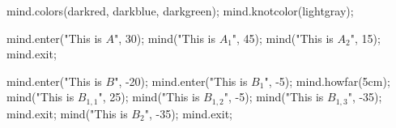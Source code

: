\usemodule[mindmap]
\startMPpage
mind.colors(darkred, darkblue, darkgreen);
mind.knotcolor(lightgray);

mind.enter("This is $A$", 30);
    mind("This is $A_1$", 45);
    mind("This is $A_2$", 15);
mind.exit;

mind.enter("This is $B$", -20);
    mind.enter("This is $B_{1}$", -5);
        mind.howfar(5cm);
        mind("This is $B_{1,1}$", 25);
        mind("This is $B_{1,2}$", -5);
        mind("This is $B_{1,3}$", -35);
    mind.exit;
    mind("This is $B_2$", -35);
mind.exit;
\stopMPpage

